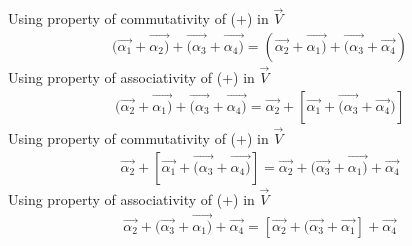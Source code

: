 %
%	
Using property of commutativity of (+) in $\vec{V}$
\begin{align}
    (\vec{\alpha_1}+\vec{\alpha_2)}+\vec{(\alpha_3}+\vec{\alpha_4)}=(\vec{\alpha_2}+\vec{\alpha_1)}+\vec{(\alpha_3}+\vec{\alpha_4})
\end{align}
Using property of associativity of (+) in $\vec{V}$
\begin{align}
(\vec{\alpha_2}+\vec{\alpha_1)}+\vec{(\alpha_3}+\vec{\alpha_4)}=
    \vec{\alpha_2}+[\vec{\alpha_1}+\vec{(\alpha_3}+\vec{\alpha_4})]
\end{align}
Using property of commutativity of (+) in $\vec{V}$
\begin{align}
\vec{\alpha_2}+[\vec{\alpha_1}+\vec{(\alpha_3}+\vec{\alpha_4)}]=
    \vec{\alpha_2}+(\vec{\alpha_3}+\vec{\alpha_1)}+\vec{\alpha_4}
\end{align}
Using property of associativity of (+) in $\vec{V}$
\begin{align}
\vec{\alpha_2}+(\vec{\alpha_3}+\vec{\alpha_1)}+\vec{\alpha_4}=[\vec{\alpha_2}+(\vec{\alpha_3}+\vec{\alpha_1}]+ \vec{\alpha_4}
\end{align}

   

